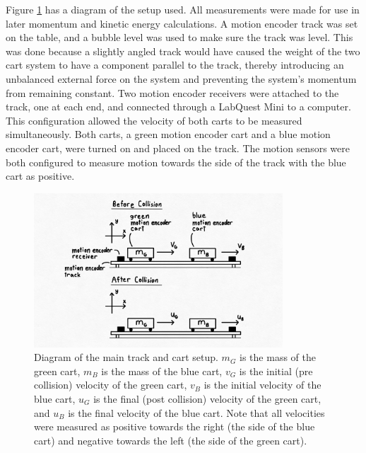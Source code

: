 \documentclass[12pt]{iopart} %
\begin{document}
Figure \ref{fig:mainsetup} has a diagram of the setup used.
All measurements were made for use in later momentum and kinetic energy calculations.
A motion encoder track was set on the table, and a bubble level was used to make sure the track was level.
This was done because a slightly angled track would have caused the weight of the two cart system to have a component parallel to the track, thereby introducing an unbalanced external force on the system and preventing the system's momentum from remaining constant.
Two motion encoder receivers were attached to the track, one at each end, and connected through a LabQuest Mini to a computer.
This configuration allowed the velocity of both carts to be measured simultaneously.
Both carts, a green motion encoder cart and a blue motion encoder cart, were turned on and placed on the track.
The motion sensors were both configured to measure motion towards the side of the track with the blue cart as positive.

\begin{figure}[htbp]
  \begin{indented}
  \item[]\includegraphics[width=0.83\textwidth]{main-setup-diagram.png}
  \end{indented}
  \caption{\label{fig:mainsetup}
  Diagram of the main track and cart setup.
  $m_G$ is the mass of the green cart, $m_B$ is the mass of the blue cart, $v_G$ is the initial (pre collision) velocity of the green cart, $v_B$ is the initial velocity of the blue cart, $u_G$ is the final (post collision) velocity of the green cart, and $u_B$ is the final velocity of the blue cart.
  Note that all velocities were measured as positive towards the right (the side of the blue cart) and negative towards the left (the side of the green cart).
  }
\end{figure}
\end{document}
